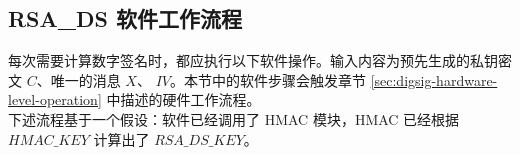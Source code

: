 \documentclass[main\_\_CN.tex]{subfiles}
\begin{document}
\subsection{RSA\_DS 软件工作流程}

每次需要计算数字签名时，都应执行以下软件操作。输入内容为预先生成的私钥密文 \begin{math}C\end{math}、唯一的消息 \begin{math}X\end{math}、 \begin{math}IV\end{math}。本节中的软件步骤会触发章节 \ref{sec:digsig-hardware-level-operation} 中描述的硬件工作流程。\\
下述流程基于一个假设：软件已经调用了 HMAC 模块，HMAC 已经根据 \begin{math}HMAC\_KEY\end{math} 计算出了 \begin{math}RSA\_DS\_KEY\end{math}。
\end{document}
